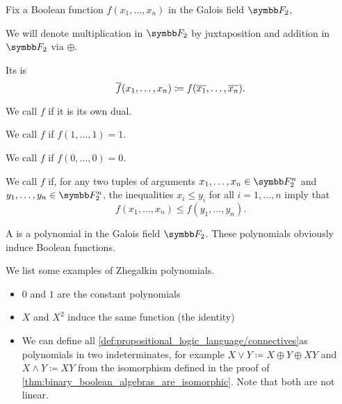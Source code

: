\begin{definition}\label{def:boolean_functions_in_f2}
  Fix a Boolean function \( f(x_1, \ldots, x_n) \) in the Galois field \( \F_2 \),

  We will denote multiplication in \( \F_2 \) by juxtaposition and addition in \( \F_2 \) via \( \oplus \).

  \begin{defenum}
     Its  is
    \begin{equation*}
       \overline{f}(x_1, \ldots, x_n) \coloneqq f(\overline{x_1}, \ldots, \overline{x_n}).
    \end{equation*}

     We call \( f \)  if it is its own dual.

     We call \( f \) if \( f(1, \ldots, 1) = 1 \).

     We call \( f \) if \( f(0, \ldots, 0) = 0 \).

     We call \( f \)  if, for any two tuples of arguments \( x_1, \ldots, x_n \in \F_2^n \) and \( y_1, \ldots, y_n \in \F_2^n \), the inequalities \( x_i \leq y_i \) for all \( i = 1, \ldots, n \) imply that
    \begin{equation*}
      f(x_1, \ldots, x_n) \leq f(y_1, \ldots, y_n).
    \end{equation*}
  \end{defenum}
\end{definition}

\begin{definition}\label{def:zhegalkin_polynomial}
  A  is a polynomial in the Galois field \( \F_2 \). These polynomials obviously induce Boolean functions.
\end{definition}

\begin{example}\label{ex:zhegalkin_polynomials}
  We list some examples of Zhegalkin polynomials.

  \begin{itemize}
    \item \( 0 \) and \( 1 \) are the constant polynomials
    \item \( X \) and \( X^2 \) induce the same function (the identity)
    \item We can define all \ref{def:propositional_logic_language/connectives}as polynomials in two indeterminates, for example \( X \lor Y \coloneqq X \oplus Y \oplus XY \) and \( X \land Y \coloneqq XY \) from the isomorphism defined in the proof of \cref{thm:binary_boolean_algebras_are_isomorphic}. Note that both are not linear.
  \end{itemize}
\end{example}

